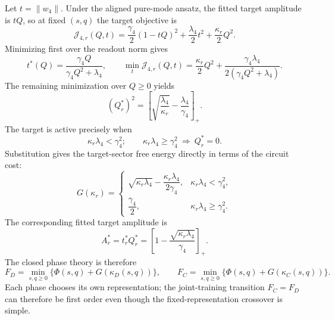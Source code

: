 \documentclass[10pt]{article}
\begin{document}
Let $t=\|w_4\|$.  Under the aligned pure-mode ansatz, the fitted target amplitude is $tQ$,
so at fixed $(s,q)$ the target objective is
\begin{equation}
\mathcal J_{4,r}(Q,t)=\frac{\gamma_4}{2}(1-tQ)^2
+\frac{\lambda_4}{2}t^2+\frac{\kappa_r}{2}Q^2.
\label{eq:target-objective}
\end{equation}
Minimizing first over the readout norm gives
\begin{equation}
t^*(Q)=\frac{\gamma_4Q}{\gamma_4Q^2+\lambda_4},\qquad
\min_t\mathcal J_{4,r}(Q,t)=\frac{\kappa_r}{2}Q^2
+\frac{\gamma_4\lambda_4}{2(\gamma_4Q^2+\lambda_4)}.
\label{eq:readout-eliminated}
\end{equation}
The remaining minimization over $Q\geq0$ yields
\begin{equation}
(Q_r^*)^2=\left[\sqrt{\frac{\lambda_4}{\kappa_r}}
-\frac{\lambda_4}{\gamma_4}\right]_+.
\label{eq:q4-optimum}
\end{equation}
The target is active precisely when
\begin{equation}
\kappa_r\lambda_4<\gamma_4^2;\qquad
\kappa_r\lambda_4\geq\gamma_4^2\ \Longrightarrow\ Q_r^*=0.
\label{eq:activity}
\end{equation}
Substitution gives the target-sector free energy directly in terms of the circuit cost:
\begin{equation}
G(\kappa_r)=
\begin{cases}
\sqrt{\kappa_r\lambda_4}-\dfrac{\kappa_r\lambda_4}{2\gamma_4},
&\kappa_r\lambda_4<\gamma_4^2,\\[6pt]
\dfrac{\gamma_4}{2},&\kappa_r\lambda_4\geq\gamma_4^2.
\end{cases}
\label{eq:target-free}
\end{equation}
The corresponding fitted target amplitude is
\begin{equation}
A_r^*=t_r^*Q_r^*=\left[1-\frac{\sqrt{\kappa_r\lambda_4}}{\gamma_4}\right]_+.
\label{eq:target-amplitude}
\end{equation}
The closed phase theory is therefore
\begin{equation}
\boxed{F_D=\min_{s,q\geq0}\{\Phi(s,q)+G(\kappa_D(s,q))\},\qquad
F_C=\min_{s,q\geq0}\{\Phi(s,q)+G(\kappa_C(s,q))\}.}
\label{eq:free-energies}
\end{equation}
Each phase chooses its own representation; the joint-training transition $F_C=F_D$ can
therefore be first order even though the fixed-representation crossover is simple.
\end{document}
